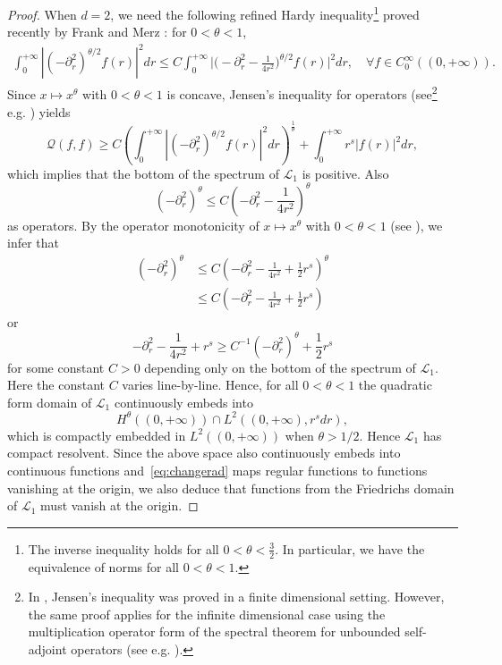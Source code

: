 \documentclass[%
11pt,  reqno]{amsart}
\theoremstyle{remarkstyle}
\newcommand{\1}{\hspace{0.2mm}\text{I}\hspace{0.2mm}}
\renewcommand{\L}{\mathcal{L}}
\numberwithin{equation}{section}
\numberwithin{theorem}{section}
\begin{document}
\begin{proof}
		When $d=2$, we need the following refined Hardy inequality\footnote{The inverse inequality holds for all $0<\theta<\frac{3}{2}$. In particular, we have the equivalence of norms for all $0<\theta<1$.} proved recently by Frank and Merz \cite{FM23}: for $0<\theta<1$,
		\begin{align}\label{Hardy-ineq-2d}
			\int_0^{+\infty} |(-\partial^2_r)^{\theta/2} f(r)|^2 dr \leq C \int_0^{+\infty}\Big|\Big(-\partial^2_r -\frac{1}{4r^2}\Big)^{\theta/2}f(r)\Big|^2 dr, \quad \forall f \in C^\infty_0((0,+\infty)).
		\end{align}
		Since $x \mapsto x^\theta$ with $0<\theta<1$ is concave, Jensen's inequality for operators (see\footnote{In \cite[Theorem 8.9]{Simon15}, Jensen's inequality was proved in a finite dimensional setting. However, the same proof applies for the infinite dimensional case using the multiplication operator form of the spectral theorem for unbounded self-adjoint operators (see e.g. \cite[Theorem VII.4]{RS75}).} e.g. \cite[Theorem 8.9]{Simon15}) yields
		$$\mathcal Q(f,f) \geq C \left(\int_0^{+\infty} |(-\partial^2_r)^{\theta/2} f(r)|^2 dr\right)^{\frac1\theta} + \int_0^{+\infty} r^s  |f(r)|^2 dr, $$
		which implies that the bottom of the spectrum of $\L_1$ is positive. Also
		\[
		(-\partial^2_r)^\theta \leq C \left(-\partial^2_r -\frac{1}{4r^2} \right)^\theta 
		\]
		as operators. By the operator monotonicity of $x \mapsto x^\theta$ with $0<\theta<1$ (see \cite[Theorem 2.6]{Carlen10}), we infer that
		\begin{align}
			(-\partial^2_r)^\theta 	&\leq C \left(-\partial^2_r -\frac{1}{4r^2}  + \frac{1}{2} r^s\right)^\theta \nonumber\\
			&\leq C \left(-\partial^2_r -\frac{1}{4r^2}  + \frac{1}{2} r^s\right) \label{est-A-theta}
		\end{align}
		or 
		\[
		-\partial^2_r -\frac{1}{4r^2} + r^s \geq C^{-1} (-\partial^2_r)^\theta + \frac{1}{2} r^s
		\]
		for some constant $C>0$ depending only on the bottom of the spectrum of $\L_1$. Here the constant $C$ varies line-by-line. Hence, for all $0<\theta <1$ the quadratic form domain of $\L_1$ continuously embeds into 
		$$ H^\theta ((0,+\infty)) \cap  L^2 ((0,+\infty),r^s dr),$$
		which is compactly embedded in $L^2((0,+\infty))$ when $\theta > 1/2$. Hence $\L_1$ has compact resolvent. Since the above space also continuously embeds into continuous functions and~\eqref{eq:changerad} maps regular functions to functions vanishing at the origin, we also deduce that functions from the Friedrichs domain of $\L_1$ must vanish at the origin.
		

\end{proof}
\end{document}
